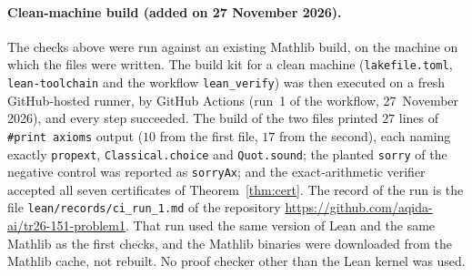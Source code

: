 \paragraph{Clean-machine build (added on 27 November 2026).} The checks above were run against an existing
Mathlib build, on the machine on which the files were written. The build kit for a clean machine
(\texttt{lakefile.toml}, \texttt{lean-toolchain} and the workflow \texttt{lean\_verify}) was then executed on a
fresh GitHub-hosted runner, by GitHub Actions (run~1 of the workflow, 27~November 2026), and every step
succeeded. The build of the two files printed $27$ lines of \texttt{\#print axioms} output ($10$ from the
first file, $17$ from the second), each naming exactly \texttt{propext}, \texttt{Classical.choice} and
\texttt{Quot.sound}; the planted \texttt{sorry} of the negative control was reported as \texttt{sorryAx}; and
the exact-arithmetic verifier accepted all seven certificates of Theorem~\ref{thm:cert}. The record of the run
is the file \texttt{lean/records/ci\_run\_1.md} of the repository
\url{https://github.com/aqida-ai/tr26-151-problem1}. That run used the same version of Lean and the same
Mathlib as the first checks, and the Mathlib binaries were downloaded from the Mathlib cache, not rebuilt. No
proof checker other than the Lean kernel was used.
